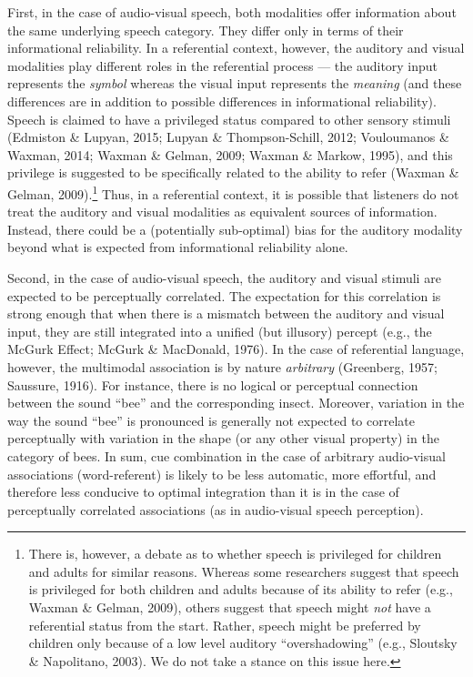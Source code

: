 \documentclass[english,,man,floatsintext]{apa6}
\let\rmarkdownfootnote\footnote%
\def\footnote{\protect\rmarkdownfootnote}
\theoremstyle{definition}
\theoremstyle{definition}
\theoremstyle{definition}
\theoremstyle{remark}
\begin{document}
First, in the case of audio-visual speech, both modalities offer
information about the same underlying speech category. They differ only
in terms of their informational reliability. In a referential context,
however, the auditory and visual modalities play different roles in the
referential process --- the auditory input represents the \emph{symbol}
whereas the visual input represents the \emph{meaning} (and these
differences are in addition to possible differences in informational
reliability). Speech is claimed to have a privileged status compared to
other sensory stimuli (Edmiston \& Lupyan, 2015; Lupyan \&
Thompson-Schill, 2012; Vouloumanos \& Waxman, 2014; Waxman \& Gelman,
2009; Waxman \& Markow, 1995), and this privilege is suggested to be
specifically related to the ability to refer (Waxman \& Gelman,
2009).\footnote{There is, however, a debate as to whether speech is
  privileged for children and adults for similar reasons. Whereas some
  researchers suggest that speech is privileged for both children and
  adults because of its ability to refer (e.g., Waxman \& Gelman, 2009),
  others suggest that speech might \emph{not} have a referential status
  from the start. Rather, speech might be preferred by children only
  because of a low level auditory ``overshadowing'' (e.g., Sloutsky \&
  Napolitano, 2003). We do not take a stance on this issue here.} Thus,
in a referential context, it is possible that listeners do not treat the
auditory and visual modalities as equivalent sources of information.
Instead, there could be a (potentially sub-optimal) bias for the
auditory modality beyond what is expected from informational reliability
alone.

Second, in the case of audio-visual speech, the auditory and visual
stimuli are expected to be perceptually correlated. The expectation for
this correlation is strong enough that when there is a mismatch between
the auditory and visual input, they are still integrated into a unified
(but illusory) percept (e.g., the McGurk Effect; McGurk \& MacDonald,
1976). In the case of referential language, however, the multimodal
association is by nature \emph{arbitrary} (Greenberg, 1957; Saussure,
1916). For instance, there is no logical or perceptual connection
between the sound \enquote{bee} and the corresponding insect. Moreover,
variation in the way the sound \enquote{bee} is pronounced is generally
not expected to correlate perceptually with variation in the shape (or
any other visual property) in the category of bees. In sum, cue
combination in the case of arbitrary audio-visual associations
(word-referent) is likely to be less automatic, more effortful, and
therefore less conducive to optimal integration than it is in the case
of perceptually correlated associations (as in audio-visual speech
perception).
\end{document}

